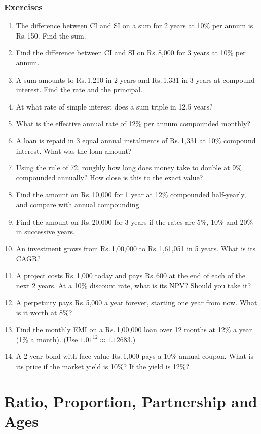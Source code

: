 \documentclass[11pt,a4paper,openany]{report}
\newenvironment{exercises}{\subsection*{Exercises \thechapter}\begin{enumerate}[label=\textbf{\thechapter.\arabic*},leftmargin=3.2em]}{\end{enumerate}}
\newcommand{\Rs}{Rs.\,}
\begin{document}
\begin{exercises}
\item The difference between CI and SI on a sum for 2 years at 10\% per annum is \Rs150. Find the sum.
\item Find the difference between CI and SI on \Rs8,000 for 3 years at 10\% per annum.
\item A sum amounts to \Rs1,210 in 2 years and \Rs1,331 in 3 years at compound interest. Find the rate and the principal.
\item At what rate of simple interest does a sum triple in 12.5 years?
\item What is the effective annual rate of 12\% per annum compounded monthly?
\item A loan is repaid in 3 equal annual instalments of \Rs1,331 at 10\% compound interest. What was the loan amount?
\item Using the rule of 72, roughly how long does money take to double at 9\% compounded annually? How close is this to the exact value?
\item Find the amount on \Rs10,000 for 1 year at 12\% compounded half-yearly, and compare with annual compounding.
\item Find the amount on \Rs20,000 for 3 years if the rates are 5\%, 10\% and 20\% in successive years.
\item An investment grows from \Rs1,00,000 to \Rs1,61,051 in 5 years. What is its CAGR?
\item A project costs \Rs1,000 today and pays \Rs600 at the end of each of the next 2 years. At a 10\% discount rate, what is its NPV? Should you take it?
\item A perpetuity pays \Rs5,000 a year forever, starting one year from now. What is it worth at 8\%?
\item Find the monthly EMI on a \Rs1,00,000 loan over 12 months at 12\% a year (1\% a month). (Use $1.01^{12}\approx1.12683$.)
\item A 2-year bond with face value \Rs1,000 pays a 10\% annual coupon. What is its price if the market yield is 10\%? If the yield is 12\%?
\end{exercises}

\chapter{Ratio, Proportion, Partnership and Ages}\label{ch:ratio}
\end{document}
